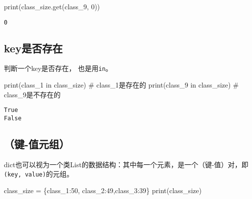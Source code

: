 \documentclass[
  letterpaper,
  DIV=11,
  numbers=noendperiod]{scrreprt}
\newenvironment{Shaded}{\begin{snugshade}}{\end{snugshade}}
\newcommand{\BuiltInTok}[1]{\textcolor[rgb]{0.00,0.23,0.31}{#1}}
\newcommand{\CommentTok}[1]{\textcolor[rgb]{0.37,0.37,0.37}{#1}}
\newcommand{\DecValTok}[1]{\textcolor[rgb]{0.68,0.00,0.00}{#1}}
\newcommand{\KeywordTok}[1]{\textcolor[rgb]{0.00,0.23,0.31}{#1}}
\newcommand{\NormalTok}[1]{\textcolor[rgb]{0.00,0.23,0.31}{#1}}
\newcommand{\OperatorTok}[1]{\textcolor[rgb]{0.37,0.37,0.37}{#1}}
\newcommand{\StringTok}[1]{\textcolor[rgb]{0.13,0.47,0.30}{#1}}
\begin{document}
\begin{Shaded}
\begin{Highlighting}[]
\BuiltInTok{print}\NormalTok{(class\_size.get(}\StringTok{\textquotesingle{}class\_9\textquotesingle{}}\NormalTok{, }\DecValTok{0}\NormalTok{)) }
\end{Highlighting}
\end{Shaded}

\begin{verbatim}
0
\end{verbatim}

\hypertarget{keyux662fux5426ux5b58ux5728}{%
\subsection{key是否存在}\label{keyux662fux5426ux5b58ux5728}}

判断一个key是否存在， 也是用\texttt{in}。

\begin{Shaded}
\begin{Highlighting}[]
\BuiltInTok{print}\NormalTok{(}\StringTok{\textquotesingle{}class\_1\textquotesingle{}} \KeywordTok{in}\NormalTok{ class\_size) }\CommentTok{\# class\_1是存在的}
\BuiltInTok{print}\NormalTok{(}\StringTok{\textquotesingle{}class\_9\textquotesingle{}} \KeywordTok{in}\NormalTok{ class\_size) }\CommentTok{\# class\_9是不存在的}
\end{Highlighting}
\end{Shaded}

\begin{verbatim}
True
False
\end{verbatim}

\hypertarget{ux952e-ux503cux5143ux7ec4}{%
\subsection{（键-值元组）}\label{ux952e-ux503cux5143ux7ec4}}

dict也可以视为一个类List的数据结构：其中每一个元素，是一个（键-值）对，即\texttt{(key,\ value)}的元组。

\begin{Shaded}
\begin{Highlighting}[]
\NormalTok{class\_size }\OperatorTok{=}\NormalTok{ \{}\StringTok{\textquotesingle{}class\_1\textquotesingle{}}\NormalTok{:}\DecValTok{50}\NormalTok{, }\StringTok{\textquotesingle{}class\_2\textquotesingle{}}\NormalTok{:}\DecValTok{49}\NormalTok{,}\StringTok{\textquotesingle{}class\_3\textquotesingle{}}\NormalTok{:}\DecValTok{39}\NormalTok{\}}
\BuiltInTok{print}\NormalTok{(class\_size)}
\end{Highlighting}
\end{Shaded}
\end{document}
